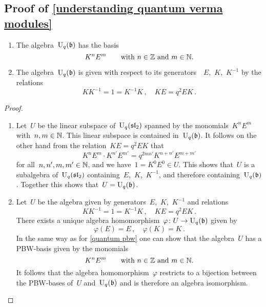 \documentclass[a4paper, 11pt, oneside]{scrartcl}
\begin{document}
\subsection{Proof of \cref{understanding quantum verma modules}}
\label{proof of understanding quantum verma modules}

\begin{proposition}
  \label{quantum borel}
  \leavevmode
  \begin{enumerate}
    \item
      The algebra~$\operatorname{U}_q(\mathfrak{b})$ has the basis
      \[
        K^n E^m
        \qquad
        \text{with~$n \in \mathbb{Z}$ and~$m \in \mathbb{N}$.}
      \]
    \item
      The algebra~$\operatorname{U}_q(\mathfrak{b})$ is given with respect to its generators~~$E$,~$K$,~$K^{-1}$ by the relations
      \[
        K K^{-1} = 1 = K^{-1} K \,,
        \quad
        K E = q^2 E K \,.
      \]
  \end{enumerate}
\end{proposition}

\begin{proof}
  \leavevmode
  \begin{enumerate}
    \item
      Let~$U$ be the linear subspace of~$\operatorname{U}_q(\mathfrak{sl}_2)$ spanned by the monomials~$K^n E^m$ with~$n, m \in \mathbb{N}$.
      This linear subspace is contained in~$\operatorname{U}_q(\mathfrak{b})$.
      It follows on the other hand from the relation~$KE = q^2 EK$ that
      \[
        K^n E^m \cdot K^{n'} E^{m'}
        =
        q^{2 m n'} K^{n + n'} E^{m + m'}
      \]
      for all~$n, n', m, m' \in \mathbb{N}$, and we have~$1 = K^0 E^0 \in U$.
      This shows that~$U$ is a subalgebra of~$\operatorname{U}_q(\mathfrak{sl}_2)$ containing~$E$,~$K$,~$K^{-1}$, and therefore containing~$\operatorname{U}_q(\mathfrak{b})$.
      Together this shows that~$U = \operatorname{U}_q(\mathfrak{b})$.
    \item
      Let~$U$ be the algebra given by generators~$E$,~$K$,~$K^{-1}$ and relations
      \[
        K K^{-1} = 1 = K^{-1} K \,,
        \quad
        KE = q^2 EK \,.
      \]
      There exists a unique algebra homomorphism~$\varphi \colon U \to \operatorname{U}_q(\mathfrak{b})$ given by
      \[
        \varphi(E) = E \,,
        \quad
        \varphi(K) = K \,.
      \]
      In the same way as for \cref{quantum pbw} one can show that the algebra~$U$ has a PBW-basis given by the monomials
      \[
        K^n E^m
        \qquad
        \text{with~$n \in \mathbb{Z}$ and~$m \in \mathbb{N}$.}
      \]
      It follows that the algebra homomorphism~$\varphi$ restricts to a bijection between the PBW-bases of~$U$ and~$\operatorname{U}_q(\mathfrak{b})$ and is therefore an algebra isomorphism.
    \qedhere
  \end{enumerate}
\end{proof}
\end{document}

